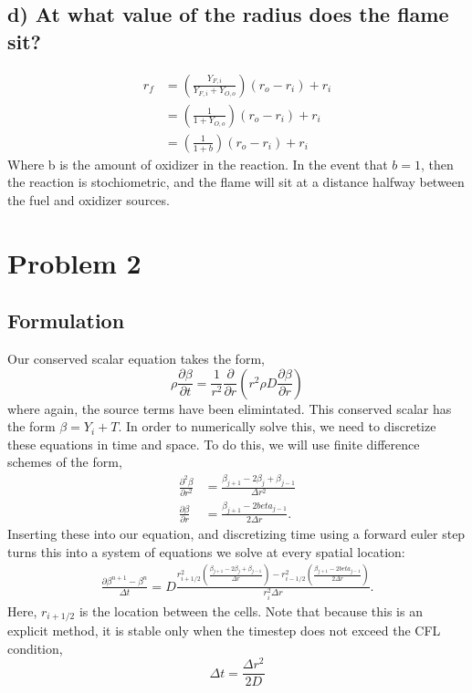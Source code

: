 \documentclass{article}
\begin{document}
\subsection*{d) At what value of the radius does the flame sit?}

\begin{eqnarray*}
 r_f &= \left(\frac{Y_{F,i}}{Y_{F,i} + Y_{O,o}} \right)(r_o - r_i) + r_i \\
     &= \left(\frac{1}{1 + Y_{O,o}} \right)(r_o - r_i) + r_i \\
     &= \left(\frac{1}{1 + b} \right)(r_o - r_i) + r_i 
\end{eqnarray*}
Where b is the amount of oxidizer in the reaction. In the event that
$b=1$, then the reaction is stochiometric, and the flame will sit at a
distance halfway between the fuel and oxidizer sources. 

\newpage
\section*{Problem 2}
\subsection*{Formulation}
Our conserved scalar equation takes the form,
\begin{equation*}
 \rho \frac{\partial \beta}{\partial t} = \frac{1}{r^2}\frac{\partial
  }{\partial r}\left( r^2 \rho D \frac{\partial \beta}{\partial r}
	       \right) 
\end{equation*}
where again, the source terms have been elimintated. This conserved
scalar has the form $\beta = Y_i + T$. In order to numerically solve
this, we need to discretize these equations in time and space. To do
this, we will use finite difference schemes of the form,
\begin{eqnarray*}
 \frac{\partial^2 \beta}{\partial r^2} &= \frac{\beta_{j+1}-2 \beta_j +
  \beta_{j-1}}{\Delta r^2}\\
 \frac{\partial \beta}{\partial r} &= \frac{\beta_{j+1}-2
 beta_{j-1}}{2\Delta r}.
\end{eqnarray*}
Inserting these into our equation, and discretizing time using a forward
euler step turns this into a system of equations we solve at every
spatial location:
\begin{eqnarray*}
\frac{\partial \beta^{n+1} - \beta^{n}}{\Delta t} = D \frac{r^2_{i+1/2}
 \left(\frac{\beta_{j+1}-2 \beta_j + \beta_{j-1}}{\Delta r}\right) -
 r^2_{i-1/2}\left(\frac{\beta_{j+1}-2 beta_{j-1}}{2\Delta r}\right)}{r^2_i\Delta r}.
\end{eqnarray*}
Here, $r_{i+1/2}$ is the location between the cells. Note that because
this is an explicit method, it is stable only when the timestep does not
exceed the CFL condition, 
\begin{equation*}
 \Delta t = \frac{\Delta r^2}{2 D}
\end{equation*}
\end{document}
